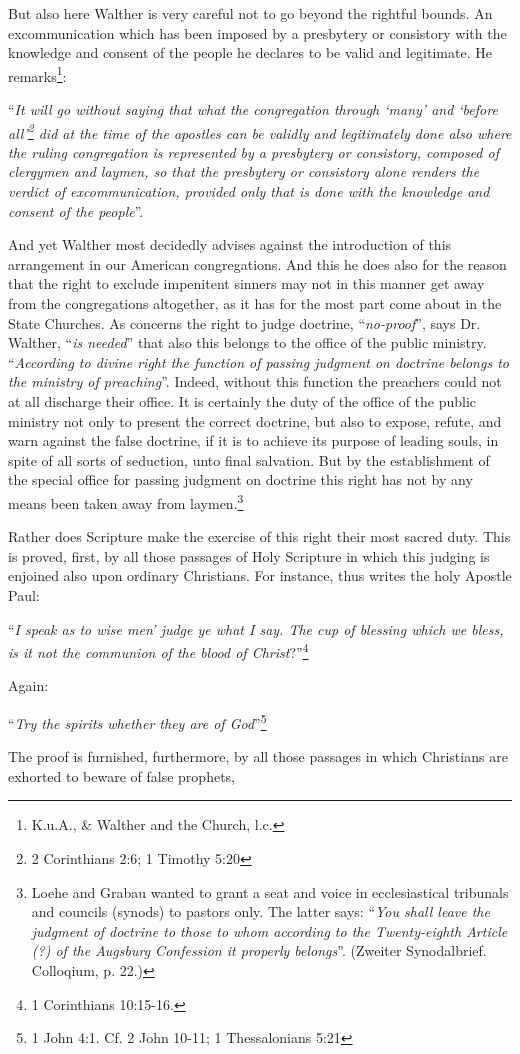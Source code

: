         But also here Walther is very careful not to go beyond the rightful bounds.  An excommunication which has been imposed by a presbytery or consistory with the knowledge and consent of the people he declares to be valid and legitimate.  He remarks\footnote{ K.u.A., & Walther and the Church, l.c.}: \begin{displayquote}“\textit{It will go without saying that what the congregation through ‘many’ and ‘before all’\footnote{2 Corinthians 2:6; 1 Timothy 5:20} did at the time of the apostles can be validly and legitimately done also where the ruling congregation is represented by a presbytery or consistory, composed of clergymen and laymen, so that the presbytery or consistory alone renders the verdict of excommunication, provided only that is done with the knowledge and consent of the people}”.\end{displayquote}  And yet Walther most decidedly advises against the introduction of this arrangement in our American congregations.  And this he does also for the reason that the right to exclude impenitent sinners may not in this manner get away from the congregations altogether, as it has for the most part come about in the State Churches.  As concerns the right to judge doctrine, “\textit{no-proof}”, says Dr. Walther, “\textit{is needed}” that also this belongs to the office of the public ministry. ``\textit{According to divine right the function of passing judgment on doctrine belongs to the ministry of preaching}”.  Indeed, without this function the preachers could not at all discharge their office.  It is certainly the duty of the office of the public ministry not only to present the correct doctrine, but also to expose, refute, and warn against the false doctrine, if it is to achieve its purpose of leading souls, in spite of all sorts of seduction, unto final salvation.  But by the establishment of the special office for passing judgment on doctrine this right has not by any means been taken away from laymen.\footnote{Loehe and Grabau wanted to grant a seat and voice in ecclesiastical tribunals and councils (synods) to pastors only.  The latter says: “\textit{You shall leave the judgment of doctrine to those to whom according to the Twenty-eighth Article (?) of the Augsburg Confession it properly belongs}”. (Zweiter Synodalbrief. Colloqium, p. 22.)}  \par Rather does Scripture make the exercise of this right their most sacred duty.  This is proved, first, by all those passages of Holy Scripture in which this judging is enjoined also upon ordinary Christians.  For instance, thus writes the holy Apostle Paul: \begin{displayquote}“\textit{I speak as to wise men’ judge ye what I say.  The cup of blessing which we bless, is it not the communion of the blood of Christ}?”\footnote{1 Corinthians 10:15-16.}\end{displayquote}  Again: \begin{displayquote}“\textit{Try the spirits whether they are of God}”\footnote{1 John 4:1.  Cf. 2 John 10-11; 1 Thessalonians 5:21}\end{displayquote} The proof is furnished, furthermore, by all those passages in which Christians are exhorted to beware of false prophets, 